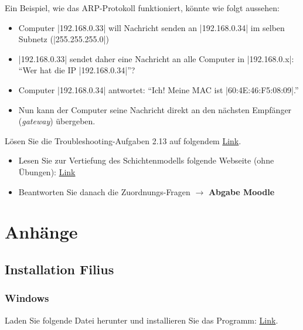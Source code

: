 Ein Beispiel, wie das \gls{ARP}-Protokoll funktioniert, könnte wie folgt aussehen:
\begin{itemize}
	\item Computer \commandbox|192.168.0.33| will Nachricht senden an \commandbox|192.168.0.34| im selben Subnetz (\commandBluebox|255.255.255.0|)
	\item \commandbox|192.168.0.33| sendet daher eine Nachricht an alle Computer in \commandbox|192.168.0.x|: ``Wer hat die IP \commandbox|192.168.0.34|''?
	\item Computer \commandbox|192.168.0.34| antwortet: ``Ich! Meine MAC ist \commandbox|60:4E:46:F5:08:09|.''
	\item Nun kann der Computer seine Nachricht direkt an den nächsten Empfänger (\textit{gateway}) übergeben.
\end{itemize}

\begin{myexercise}
	Lösen Sie die Troubleshooting-Aufgaben 2.13 auf folgendem \href{https://informatik.mygymer.ch/base/?book=network}{Link}.
\end{myexercise}

\begin{mychallenge}
	\begin{itemize}
		\item Lesen Sie zur Vertiefung des Schichtenmodells folgende Webseite (ohne Übungen): \href{https://oinf.ch/kurs/vernetzung-und-systeme/kommunikation-in-netzwerken/}{Link}
		\item Beantworten Sie danach die Zuordnungs-Fragen $\rightarrow$ \textbf{Abgabe Moodle}
	\end{itemize}
\end{mychallenge}

\newpage
\appendix
\section*{Anhänge}
\renewcommand{\thesubsection}{\Alph{subsection}}
\subsection{Installation Filius}
\label{subsec:filius-installation}
\subsubsection{Windows}
Laden Sie folgende Datei herunter und installieren Sie das Programm:  \href{https://informatik.mygymer.ch/base/?page=network/2-filius/windows/}{Link}.

